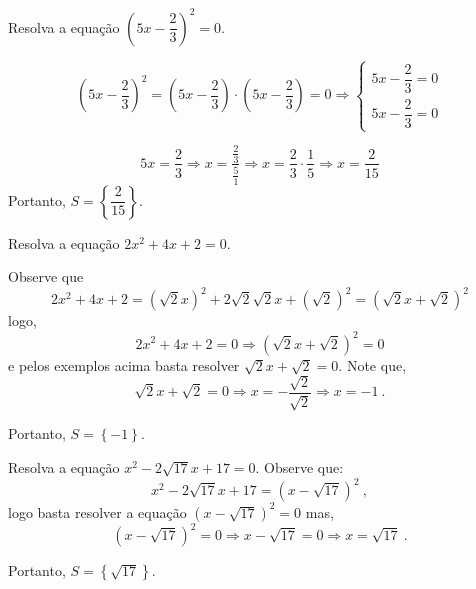  \begin{exem}
  Resolva a equação $\left(5x - \dfrac{2}{3} \right)^2= 0$.

\[\left(5x - \dfrac{2}{3} \right)^2= \left(5x - \dfrac{2}{3} \right) \cdot \left(5x - \dfrac{2}{3} \right)= 0 \Rightarrow
\begin{cases}
 5x - \dfrac{2}{3}= 0  \\
 5x - \dfrac{2}{3}= 0
\end{cases} \]

\begin{equation}
5x= \dfrac{2}{3} \Rightarrow x= \dfrac{\frac{2}{3}}{\frac{5}{1}} \Rightarrow x= \dfrac{2}{3} \cdot \dfrac{1}{5} \Rightarrow x= \dfrac{2}{15}
\end{equation}
Portanto, $S= \left\{ \dfrac{2}{15} \right\}$.
 \end{exem}

 \begin{exem}
  Resolva a equação $2x^2 + 4x + 2=0$.

 Observe que
\begin{equation}
2x^2 + 4x + 2= (\sqrt{2}x)^2 + 2 \sqrt{2}\sqrt{2}x + (\sqrt{2})^2= (\sqrt{2}x + \sqrt{2})^2
\end{equation}
 logo,
\begin{equation}
2x^2 + 4x + 2=0 \Rightarrow (\sqrt{2}x + \sqrt{2})^2= 0
\end{equation}
 e pelos exemplos acima basta resolver $\sqrt{2}x + \sqrt{2}= 0$. Note que,
\begin{equation}
\sqrt{2}x + \sqrt{2} =0 \Rightarrow x= - \dfrac{\sqrt{2}}{\sqrt{2}} \Rightarrow x= -1 \ .
\end{equation}

Portanto, $S= \left\{ -1 \right\}$.
 \end{exem}

 \begin{exem}
 Resolva a equação $x^2 - 2\sqrt{17}x + 17=0$.
Observe que:
\begin{equation}
x^2 - 2\sqrt{17}x + 17= (x - \sqrt{17})^2 \ ,
\end{equation}
logo basta resolver a equação $(x - \sqrt{17})^2= 0$ mas,
\begin{equation}
(x - \sqrt{17})^2= 0 \Rightarrow x - \sqrt{17}= 0 \Rightarrow x= \sqrt{17} \ .
\end{equation}

Portanto, $S= \left\{ \sqrt{17}  \right\}$.
 \end{exem}

